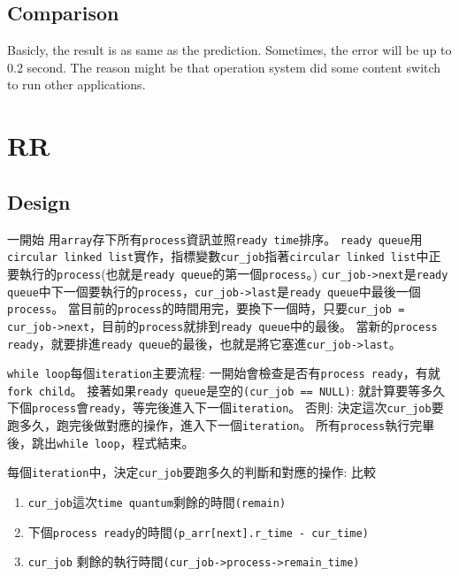 \documentclass[12pt, a4paper]{article}
\begin{document}
\subsection{Comparison}
Basicly, the result is as same as the prediction. Sometimes, the error will be up
to 0.2 second. The reason might be that operation system did some content switch
to run other applications.

\section{RR}

\subsection{Design}
一開始  用\texttt{array}存下所有\texttt{process}資訊並照\texttt{ready time}排序。
\texttt{ready queue}用\texttt{circular linked list}實作，指標變數\texttt{cur\_job}指著\texttt{circular linked list}中正要執行的\texttt{process}(也就是\texttt{ready queue}的第一個\texttt{process}。)
\texttt{cur\_job->next}是\texttt{ready queue}中下一個要執行的\texttt{process}，\texttt{cur\_job->last}是\texttt{ready queue}中最後一個\texttt{process}。
當目前的\texttt{process}的時間用完，要換下一個時，只要\texttt{cur\_job = cur\_job->next}，目前的\texttt{process}就排到\texttt{ready queue}中的最後。
當新的\texttt{process ready}，就要排進\texttt{ready queue}的最後，也就是將它塞進\texttt{cur\_job->last}。

\texttt{while loop}每個\texttt{iteration}主要流程:
一開始會檢查是否有\texttt{process ready}，有就\texttt{fork child}。
接著如果\texttt{ready queue}是空的\texttt{(cur\_job == NULL)}: 
  就計算要等多久下個\texttt{process}會\texttt{ready}，等完後進入下一個\texttt{iteration}。
否則:
  決定這次\texttt{cur\_job}要跑多久，跑完後做對應的操作，進入下一個\texttt{iteration}。
所有\texttt{process}執行完畢後，跳出\texttt{while loop}，程式結束。

每個\texttt{iteration}中，決定\texttt{cur\_job}要跑多久的判斷和對應的操作:
比較
\begin{enumerate}
\item \texttt{cur\_job}這次\texttt{time quantum}剩餘的時間\texttt{(remain)}
\item 下個\texttt{process ready}的時間\texttt{(p\_arr[next].r\_time - cur\_time)}
\item \texttt{cur\_job} 剩餘的執行時間\texttt{(cur\_job->process->remain\_time)}
\end{enumerate}
\end{document}
